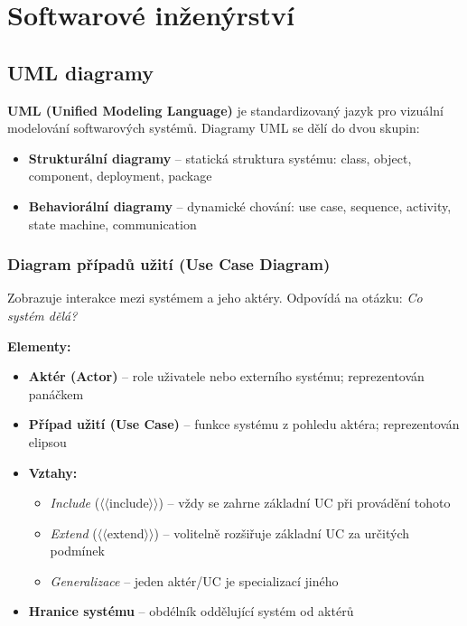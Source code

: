 \section{Softwarové inženýrství}

\subsection{UML diagramy}

\textbf{UML (Unified Modeling Language)} je standardizovaný jazyk pro vizuální modelování softwarových systémů.
Diagramy UML se dělí do dvou skupin:

\begin{itemize}
  \item \textbf{Strukturální diagramy} -- statická struktura systému: class, object, component, deployment, package
  \item \textbf{Behaviorální diagramy} -- dynamické chování: use case, sequence, activity, state machine, communication
\end{itemize}

\subsubsection{Diagram případů užití (Use Case Diagram)}

Zobrazuje interakce mezi systémem a jeho aktéry. Odpovídá na otázku: \textit{Co systém dělá?}

\textbf{Elementy:}
\begin{itemize}
  \item \textbf{Aktér (Actor)} -- role uživatele nebo externího systému; reprezentován panáčkem
  \item \textbf{Případ užití (Use Case)} -- funkce systému z pohledu aktéra; reprezentován elipsou
  \item \textbf{Vztahy:}
    \begin{itemize}
      \item \textit{Include} ($\langle\langle$include$\rangle\rangle$) -- vždy se zahrne základní UC při provádění tohoto
      \item \textit{Extend} ($\langle\langle$extend$\rangle\rangle$) -- volitelně rozšiřuje základní UC za určitých podmínek
      \item \textit{Generalizace} -- jeden aktér/UC je specializací jiného
    \end{itemize}
  \item \textbf{Hranice systému} -- obdélník oddělující systém od aktérů
\end{itemize}

